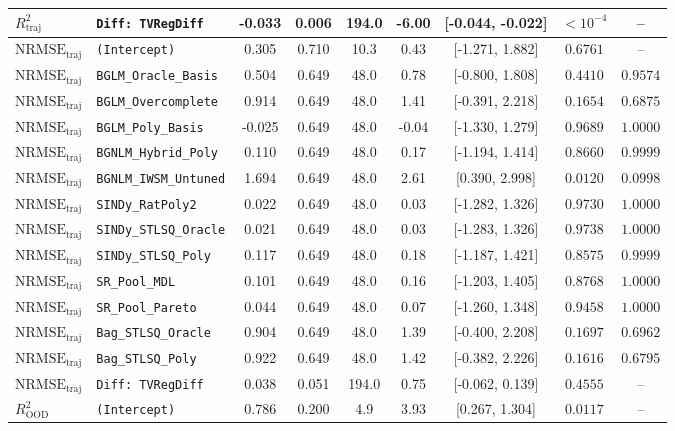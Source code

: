 \begin{table}[t]
\begin{tabular}{llccccccc}
$R^2_{\text{traj}}$ & \texttt{Diff: TVRegDiff} & -0.033 & 0.006 & 194.0 & -6.00 & [-0.044, -0.022] & $< 10^{-4}$ & -- \\
\midrule
$\text{NRMSE}_{\text{traj}}$ & \texttt{(Intercept)} & 0.305 & 0.710 & 10.3 & 0.43 & [-1.271, 1.882] & $0.6761$ & -- \\
$\text{NRMSE}_{\text{traj}}$ & \texttt{BGLM\_Oracle\_Basis} & 0.504 & 0.649 & 48.0 & 0.78 & [-0.800, 1.808] & $0.4410$ & $0.9574$ \\
$\text{NRMSE}_{\text{traj}}$ & \texttt{BGLM\_Overcomplete} & 0.914 & 0.649 & 48.0 & 1.41 & [-0.391, 2.218] & $0.1654$ & $0.6875$ \\
$\text{NRMSE}_{\text{traj}}$ & \texttt{BGLM\_Poly\_Basis} & -0.025 & 0.649 & 48.0 & -0.04 & [-1.330, 1.279] & $0.9689$ & $1.0000$ \\
$\text{NRMSE}_{\text{traj}}$ & \texttt{BGNLM\_Hybrid\_Poly} & 0.110 & 0.649 & 48.0 & 0.17 & [-1.194, 1.414] & $0.8660$ & $0.9999$ \\
$\text{NRMSE}_{\text{traj}}$ & \texttt{BGNLM\_IWSM\_Untuned} & 1.694 & 0.649 & 48.0 & 2.61 & [0.390, 2.998] & $0.0120$ & $0.0998$ \\
$\text{NRMSE}_{\text{traj}}$ & \texttt{SINDy\_RatPoly2} & 0.022 & 0.649 & 48.0 & 0.03 & [-1.282, 1.326] & $0.9730$ & $1.0000$ \\
$\text{NRMSE}_{\text{traj}}$ & \texttt{SINDy\_STLSQ\_Oracle} & 0.021 & 0.649 & 48.0 & 0.03 & [-1.283, 1.326] & $0.9738$ & $1.0000$ \\
$\text{NRMSE}_{\text{traj}}$ & \texttt{SINDy\_STLSQ\_Poly} & 0.117 & 0.649 & 48.0 & 0.18 & [-1.187, 1.421] & $0.8575$ & $0.9999$ \\
$\text{NRMSE}_{\text{traj}}$ & \texttt{SR\_Pool\_MDL} & 0.101 & 0.649 & 48.0 & 0.16 & [-1.203, 1.405] & $0.8768$ & $1.0000$ \\
$\text{NRMSE}_{\text{traj}}$ & \texttt{SR\_Pool\_Pareto} & 0.044 & 0.649 & 48.0 & 0.07 & [-1.260, 1.348] & $0.9458$ & $1.0000$ \\
$\text{NRMSE}_{\text{traj}}$ & \texttt{Bag\_STLSQ\_Oracle} & 0.904 & 0.649 & 48.0 & 1.39 & [-0.400, 2.208] & $0.1697$ & $0.6962$ \\
$\text{NRMSE}_{\text{traj}}$ & \texttt{Bag\_STLSQ\_Poly} & 0.922 & 0.649 & 48.0 & 1.42 & [-0.382, 2.226] & $0.1616$ & $0.6795$ \\
$\text{NRMSE}_{\text{traj}}$ & \texttt{Diff: TVRegDiff} & 0.038 & 0.051 & 194.0 & 0.75 & [-0.062, 0.139] & $0.4555$ & -- \\
\midrule
$R^2_{\text{OOD}}$ & \texttt{(Intercept)} & 0.786 & 0.200 & 4.9 & 3.93 & [0.267, 1.304] & $0.0117$ & -- \\

\end{tabular}
\end{table}
